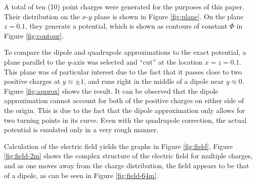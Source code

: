 \documentclass[12pt,a4paper,twoside]{article}
\begin{document}
A total of ten (10) point charges were generated for the purposes of this paper. Their distribution on the $x$-$y$ plane is shown in Figure \ref{fig:plane}. On the plane $z = 0.1$, they generate a potential, which is shown as contours of constant $\Phi$ in Figure \ref{fig:contour}.

To compare the dipole and quadrupole approximations to the exact potential, a plane parallel to the $y$-axis was selected and ``cut'' at the location $x = z = 0.1$. This plane was of particular interest due to the fact that it passes close to two positive charges at $y \approx \pm 1$, and runs right in the middle of a dipole near $y \approx 0$. Figure \ref{fig:approx} shows the result. It can be observed that the dipole approximation cannot account for both of the positive charges on either side of the origin. This is due to the fact that the dipole approximation only allows for two turning points in its curve. Even with the quadrupole correction, the actual potential is emulated only in a very rough manner.

Calculation of the electric field yields the graphs in Figure \ref{fig:field}. Figure \ref{fig:field-2m} shows the complex structure of the electric field for multiple charges, and as one moves away from the charge distribution, the field appears to be that of a dipole, as can be seen in Figure \ref{fig:field-64m}.
\end{document}
